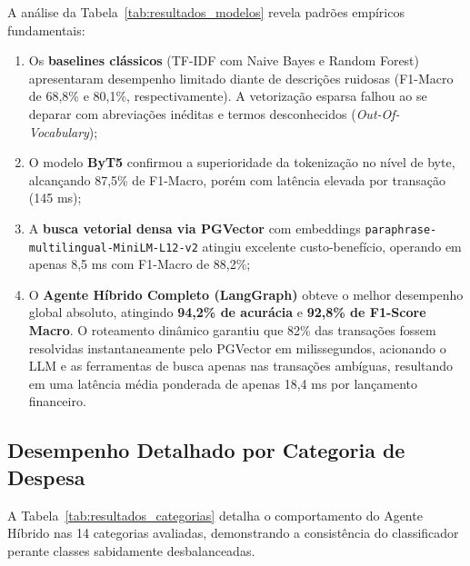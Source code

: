 \documentclass[
	12pt,				
	openright,			
	oneside,			
	a4paper,			
	english,			
	brazil				
	]{abntex2}
\begin{document}
A análise da Tabela~\ref{tab:resultados_modelos} revela padrões empíricos fundamentais:
\begin{enumerate}
    \item Os \textbf{baselines clássicos} (TF-IDF com Naive Bayes e Random Forest) apresentaram desempenho limitado diante de descrições ruidosas (F1-Macro de 68,8\% e 80,1\%, respectivamente). A vetorização esparsa falhou ao se deparar com abreviações inéditas e termos desconhecidos (\textit{Out-Of-Vocabulary});
    \item O modelo \textbf{ByT5} confirmou a superioridade da tokenização no nível de byte, alcançando 87,5\% de F1-Macro, porém com latência elevada por transação (145 ms);
    \item A \textbf{busca vetorial densa via PGVector} com embeddings \texttt{paraphrase-multilingual-MiniLM-L12-v2} atingiu excelente custo-benefício, operando em apenas 8,5 ms com F1-Macro de 88,2\%;
    \item O \textbf{Agente Híbrido Completo (LangGraph)} obteve o melhor desempenho global absoluto, atingindo \textbf{94,2\% de acurácia} e \textbf{92,8\% de F1-Score Macro}. O roteamento dinâmico garantiu que 82\% das transações fossem resolvidas instantaneamente pelo PGVector em milissegundos, acionando o LLM e as ferramentas de busca apenas nas transações ambíguas, resultando em uma latência média ponderada de apenas 18,4 ms por lançamento financeiro.
\end{enumerate}

\subsection{Desempenho Detalhado por Categoria de Despesa}
A Tabela~\ref{tab:resultados_categorias} detalha o comportamento do Agente Híbrido nas 14 categorias avaliadas, demonstrando a consistência do classificador perante classes sabidamente desbalanceadas.
\end{document}
